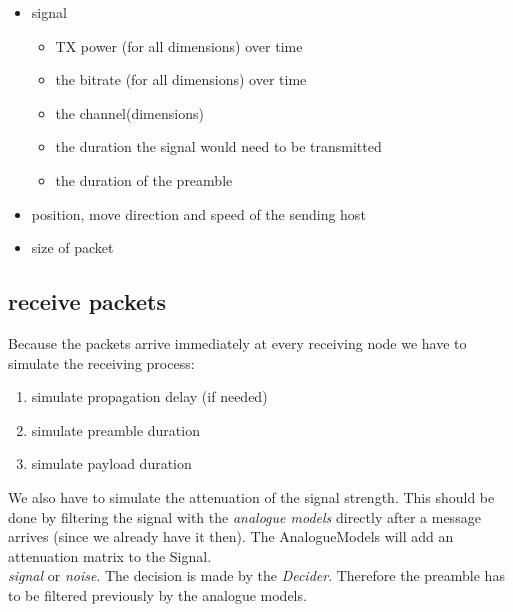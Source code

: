 \begin{itemize}
\item signal
	\begin{itemize}
	\item TX power (for all dimensions) over time
	\item the bitrate (for all dimensions) over time 
	\item the channel(dimensions)
	\item the duration the signal would need to be transmitted
	\item the duration of the preamble
	
	\end{itemize}
\item position, move direction and speed of the sending host
\item size of packet
\end{itemize}

\subsection{receive packets}
\label{receivePackets}

Because the packets arrive immediately at every receiving node we have to
simulate the receiving process:

\begin{enumerate}
\item simulate propagation delay (if needed)
\item simulate preamble duration
\item simulate payload duration
\end{enumerate}

We also have to simulate the attenuation of the signal strength. This should be done by filtering the signal with the \textit{analogue models} directly after a message arrives (since we already have it then). The AnalogueModels will add an attenuation matrix to the Signal.\\

\textit{signal} or \textit{noise}. The decision is
made by the \textit{Decider}. Therefore the preamble has to be filtered
previously by the analogue models.

